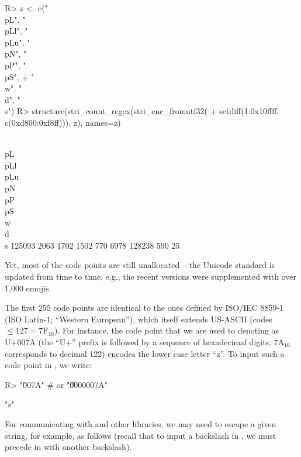 \documentclass[nojss]{jss}
\begin{document}
\begin{Schunk}
\begin{Sinput}
R> z <- c("\\p{L}", "\\p{Ll}", "\\p{Lu}", "\\p{N}", "\\p{P}", "\\p{S}",
+         "\\w", "\\d", "\\s")
R> structure(stri_count_regex(stri_enc_fromutf32(
+      setdiff(1:0x10ffff, c(0xd800:0xf8ff))), z), names=z)
\end{Sinput}
\begin{Soutput}
 \\p{L} \\p{Ll} \\p{Lu}  \\p{N}  \\p{P}  \\p{S}     \\w     \\d     \\s
 125093    2063    1702    1502     770    6978  128238     590      25
\end{Soutput}
\end{Schunk}

Yet, most of the code points are still unallocated -- the Unicode
standard is updated from time to time, e.g., the recent versions
were supplemented with over 1{,}000 emojis.


The first 255 code points are identical to the ones defined
by ISO/IEC 8859-1 (ISO Latin-1;
``Western European''), which itself extends US-ASCII (codes $\le 127=\text{7F}{}_{16}$).
For instance, the code point that we are used to denoting as U+007A
(the ``U+'' prefix is followed by a sequence of hexadecimal digits;
7A${}_{16}$ corresponds to decimal 122) encodes the lower case letter ``z''.
To input such a code point in , we write:

\begin{Schunk}
\begin{Sinput}
R> "\u007A"  # or "\U0000007A"
\end{Sinput}
\begin{Soutput}
[1] "z"
\end{Soutput}
\end{Schunk}


For communicating with  and other libraries,
we may need to escape a given string, for example, as follows
(recall that to input a backslash in ,
we must precede in with another backslash).
\end{document}
